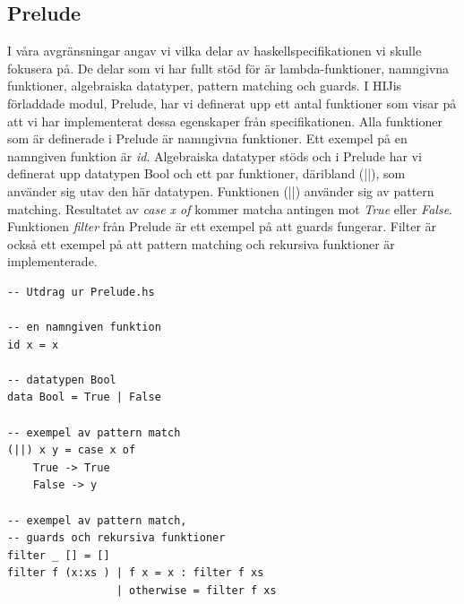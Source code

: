 \subsection{Prelude}
I våra avgränsningar angav vi vilka delar av haskellspecifikationen vi skulle fokusera på. De delar som vi har fullt stöd för är lambda-funktioner, namngivna funktioner, algebraiska datatyper, pattern matching och guards. 
I HIJis förladdade  modul, Prelude, har vi definerat upp ett antal funktioner som visar på att vi har implementerat dessa egenskaper från specifikationen.
Alla funktioner som är definerade i Prelude är namngivna funktioner. Ett exempel på en namngiven funktion är \emph{id}. 
Algebraiska datatyper stöds och i  Prelude har vi definerat upp datatypen Bool och ett par funktioner, däribland (||), som använder sig utav den här datatypen. Funktionen (||) använder sig av pattern matching. Resultatet av \emph{case x of} kommer matcha antingen mot \emph{True} eller \emph{False}.
Funktionen \emph{filter} från Prelude är ett exempel på att guards fungerar. Filter är också ett exempel på att pattern matching och rekursiva funktioner är implementerade. 

\begin{lstlisting}
-- Utdrag ur Prelude.hs

-- en namngiven funktion
id x = x

-- datatypen Bool
data Bool = True | False

-- exempel av pattern match
(||) x y = case x of
    True -> True
    False -> y

-- exempel av pattern match, 
-- guards och rekursiva funktioner
filter _ [] = []
filter f (x:xs ) | f x = x : filter f xs
                 | otherwise = filter f xs
\end{lstlisting}

